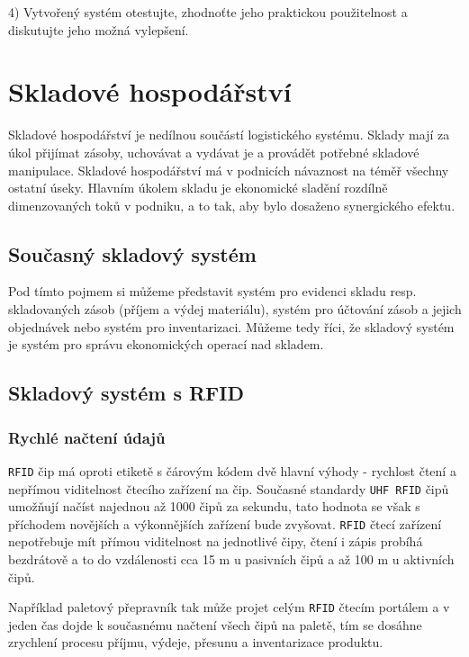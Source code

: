 \documentclass[czech,BP]{thesiskiv}
\begin{document}
4) Vytvořený systém otestujte, zhodnoťte jeho praktickou použitelnost a diskutujte jeho možná vylepšení.
\fi

\chapter{Skladové hospodářství}
Skladové hospodářství je nedílnou součástí logistického systému. Sklady mají za úkol přijímat zásoby, uchovávat a vydávat je a provádět potřebné skladové manipulace. Skladové hospodářství má v podnicích návaznost na téměř všechny ostatní úseky. Hlavním úkolem skladu je ekonomické sladění rozdílně dimenzovaných toků v podniku, a to tak, aby bylo dosaženo synergického efektu.\cite{vitek2007skladove}

\section{Současný skladový systém}
Pod tímto pojmem si můžeme představit systém pro evidenci skladu resp. skladovaných zásob (příjem  a  výdej  materiálu), systém pro účtování zásob a jejich objednávek nebo systém pro inventarizaci. Můžeme tedy říci, že skladový systém je systém pro správu ekonomických operací nad skladem.\cite{hron2014skladovy}

\section{Skladový systém s RFID}

\subsection{Rychlé načtení údajů}
\texttt{RFID} čip má oproti etiketě s čárovým kódem dvě hlavní výhody - rychlost čtení a nepřímou viditelnost čtecího zařízení na čip. Současné standardy \texttt{UHF RFID} čipů umožňují načíst najednou až 1000 čipů za sekundu, tato hodnota se však s příchodem novějších a výkonnějších zařízení bude zvyšovat. \texttt{RFID} čtecí zařízení nepotřebuje mít přímou viditelnost na jednotlivé čipy, čtení i zápis probíhá bezdrátově a to do vzdálenosti cca 15 m u pasivních čipů a až 100 m u aktivních čipů.\cite{dolevcek2010identifikace}

Například paletový přepravník tak může projet celým \texttt{RFID} čtecím portálem a v jeden čas dojde k současnému načtení všech čipů na paletě, tím se dosáhne zrychlení procesu příjmu, výdeje, přesunu a inventarizace produktu.\cite{dolevcek2010identifikace}
\end{document}
